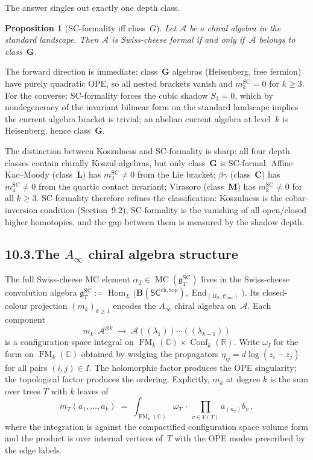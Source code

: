 \documentclass[11pt]{report}
\newtheorem{proposition}[theorem]{Proposition}
\theoremstyle{definition}
\theoremstyle{remark}
\providecommand{\cA}{\mathcal{A}}
\numberwithin{equation}{section}
\begin{document}
The answer singles out exactly one depth class.

\begin{proposition}[SC-formality iff class~$G$]
\label{prop:svy-sc-formal-iff-g}
Let\/ $\cA$ be a chiral algebra in the standard landscape.
Then\/ $\cA$ is Swiss-cheese formal if and only if\/~$\cA$
belongs to class~$\mathbf{G}$.
\end{proposition}

\noindent
The forward direction is immediate: class~$\mathbf{G}$ algebras
(Heisenberg, free fermion) have purely quadratic OPE, so all nested
brackets vanish and $m_k^{\mathrm{SC}} = 0$ for $k \geq 3$. For
the converse: SC-formality forces the cubic shadow
$S_3 = 0$, which by nondegeneracy of the invariant bilinear form
on the standard landscape implies the current algebra bracket
is trivial; an abelian current algebra at level~$k$ is Heisenberg,
hence class~$\mathbf{G}$.

The distinction between Koszulness and SC-formality is sharp: all
four depth classes contain chirally Koszul algebras, but only
class~$\mathbf{G}$ is SC-formal. Affine Kac--Moody (class~$\mathbf{L}$)
has $m_3^{\mathrm{SC}} \neq 0$ from the Lie bracket;
$\beta\gamma$ (class~$\mathbf{C}$) has $m_4^{\mathrm{SC}} \neq 0$
from the quartic contact invariant; Virasoro
(class~$\mathbf{M}$) has $m_k^{\mathrm{SC}} \neq 0$ for all
$k \geq 3$. SC-formality therefore refines the classification:
Koszulness is the cobar-inversion condition (Section~9.2),
SC-formality is the vanishing of all open/closed higher
homotopies, and the gap between them is measured by the shadow
depth.

\subsection*{10.3.\enspace The $A_\infty$ chiral algebra structure}

The full Swiss-cheese MC element
$\alpha_T \in \operatorname{MC}(\mathfrak{g}^{\mathrm{SC}}_T)$
lives in the Swiss-cheese convolution algebra
$\mathfrak{g}^{\mathrm{SC}}_T :=
\operatorname{Hom}_\Sigma\bigl(
\mathbf{B}(\mathsf{SC}^{\mathrm{ch,top}}),
\operatorname{End}_{(B_\partial,\,\mathcal{C}_{\mathrm{line}})}\bigr)$.
Its closed-colour projection $(m_k)_{k\ge 1}$
encodes the $A_\infty$ chiral algebra on~$\cA$. Each component
\[
m_k\colon\cA^{\otimes k}
\;\longrightarrow\;
\cA((\lambda_1))\cdots((\lambda_{k-1}))
\]
is a configuration-space integral on
$\operatorname{FM}_k(\mathbb C)\times\operatorname{Conf}_k(\mathbb R)$.
Write $\omega_I$ for the form on $\operatorname{FM}_k(\mathbb C)$
obtained by wedging the propagators $\eta_{ij}=d\log(z_i-z_j)$
for all pairs $(i,j)\in I$. The holomorphic factor produces the
OPE singularity; the topological factor produces the ordering.
Explicitly, $m_k$ at degree $k$ is the sum over trees $T$ with $k$
leaves of
\[
m_T(a_1,\ldots,a_k)
\;=\;
\int_{\operatorname{FM}_k(\mathbb C)}
\omega_T\,\cdot\,
\prod_{v\in V(T)} a_{(n_v)} b_v\,,
\]
where the integration is against the compactified configuration
space volume form and the product is over internal vertices of~$T$
with the OPE modes prescribed by the edge labels.
\end{document}
